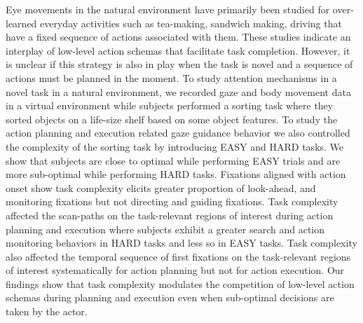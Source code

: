 Eye movements in the natural environment have primarily been studied for over-learned everyday activities such as tea-making, sandwich making, driving that have a fixed sequence of actions associated with them. These studies indicate an interplay of low-level action schemas that facilitate task completion. However, it is unclear if this strategy is also in play when the task is novel and a sequence of actions must be planned in the moment. To study attention mechanisms in a novel task in a natural environment, we recorded gaze and body movement data in a virtual environment while subjects performed a sorting task where they sorted objects on a life-size shelf based on some object features. To study the action planning and execution related gaze guidance behavior we also controlled the complexity of the sorting task by introducing EASY and HARD tasks. We show that subjects are close to optimal while performing EASY trials and are more sub-optimal while performing HARD tasks. Fixations aligned with action onset show task complexity elicits greater proportion of look-ahead, and monitoring fixations but not directing and guiding fixations. Task complexity affected the scan-paths on the task-relevant regions of interest during action planning and execution where subjects exhibit a greater search and action monitoring behaviors in HARD tasks and less so in EASY tasks. Task complexity also affected the temporal sequence of first fixations on the task-relevant regions of interest systematically for action planning but not for action execution. Our findings show that task complexity modulates the competition of low-level action schemas during planning and execution even when sub-optimal decisions are taken by the actor.